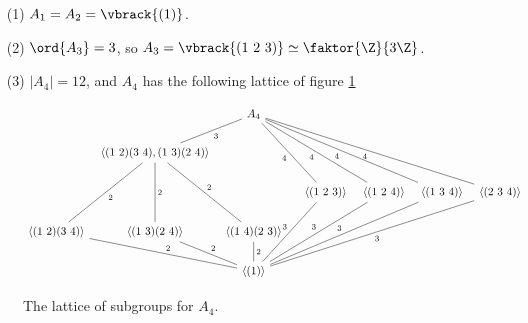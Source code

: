 \begin{example}\label{}
    \begin{enumerate}
        \item[(1)] $A_1=A_2=\vbrack{(1)}$.

        \item[(2)] $\ord{A_3}=3$, so $A_3=\vbrack{(1 \ 2 \ 3)} \simeq
            \faktor{\Z}{3\Z}$.

        \item[(3)] $|A_4|=12$, and $A_4$ has the following lattice of figure
            \ref{fig_3.5}
    \end{enumerate}
\end{example}

\begin{figure}[h]
\[\begin{tikzcd}[column sep=tiny]
	&& {A_4} \\
	& {\langle (1 \ 2)(3 \ 4),(1 \ 3)(2 \ 4) \rangle} \\
	&&&& {\langle (1 \ 2 \ 3) \rangle} & {\langle (1 \ 2 \ 4) \rangle} & {\langle (1 \ 3 \ 4) \rangle} & {\langle (2 \ 3 \ 4) \rangle} \\
	{\langle (1 \ 2)(3 \ 4) \rangle} & {\langle (1 \ 3)(2 \ 4) \rangle} & {\langle (1 \ 4)(2 \ 3) \rangle} \\
	&& {\langle (1) \rangle}
	\arrow["4"', no head, from=1-3, to=3-5]
	\arrow["4"', no head, from=1-3, to=3-6]
	\arrow["4"', no head, from=1-3, to=3-7]
	\arrow["4"', no head, from=1-3, to=3-8]
	\arrow["3", no head, from=3-8, to=5-3]
	\arrow["3"', no head, from=3-7, to=5-3]
	\arrow["3"', no head, from=3-6, to=5-3]
	\arrow["3"', no head, from=3-5, to=5-3]
	\arrow["2", no head, from=4-2, to=5-3]
	\arrow["2", no head, from=4-1, to=5-3]
	\arrow["2", no head, from=4-3, to=5-3]
	\arrow["3", no head, from=1-3, to=2-2]
	\arrow["2", no head, from=2-2, to=4-2]
	\arrow["2", no head, from=2-2, to=4-3]
	\arrow["2", no head, from=2-2, to=4-1]
\end{tikzcd}\]
    \caption{The lattice of subgroups for $A_4$.}
    \label{fig_3.5}
\end{figure}
